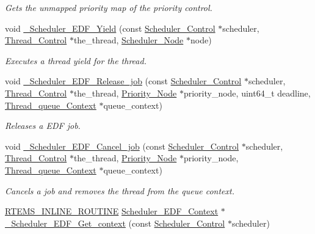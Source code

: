 \begin{DoxyCompactItemize}
\begin{DoxyCompactList}\small\item\em Gets the unmapped priority map of the priority control. \end{DoxyCompactList}\item 
void \mbox{\hyperlink{group__RTEMSScoreSchedulerEDF_ga1e56a56a016ef9317cae0090f846ceb6}{\+\_\+\+Scheduler\+\_\+\+E\+D\+F\+\_\+\+Yield}} (const \mbox{\hyperlink{struct__Scheduler__Control}{Scheduler\+\_\+\+Control}} $\ast$scheduler, \mbox{\hyperlink{struct__Thread__Control}{Thread\+\_\+\+Control}} $\ast$the\+\_\+thread, \mbox{\hyperlink{structScheduler__Node}{Scheduler\+\_\+\+Node}} $\ast$node)
\begin{DoxyCompactList}\small\item\em Executes a thread yield for the thread. \end{DoxyCompactList}\item 
void \mbox{\hyperlink{group__RTEMSScoreSchedulerEDF_gac0692f99a480bf873298367ffd5ec6a1}{\+\_\+\+Scheduler\+\_\+\+E\+D\+F\+\_\+\+Release\+\_\+job}} (const \mbox{\hyperlink{struct__Scheduler__Control}{Scheduler\+\_\+\+Control}} $\ast$scheduler, \mbox{\hyperlink{struct__Thread__Control}{Thread\+\_\+\+Control}} $\ast$the\+\_\+thread, \mbox{\hyperlink{structPriority__Node}{Priority\+\_\+\+Node}} $\ast$priority\+\_\+node, uint64\+\_\+t deadline, \mbox{\hyperlink{structThread__queue__Context}{Thread\+\_\+queue\+\_\+\+Context}} $\ast$queue\+\_\+context)
\begin{DoxyCompactList}\small\item\em Releases a E\+DF job. \end{DoxyCompactList}\item 
void \mbox{\hyperlink{group__RTEMSScoreSchedulerEDF_ga616d8e664dde0dc44953c47fa76aa65f}{\+\_\+\+Scheduler\+\_\+\+E\+D\+F\+\_\+\+Cancel\+\_\+job}} (const \mbox{\hyperlink{struct__Scheduler__Control}{Scheduler\+\_\+\+Control}} $\ast$scheduler, \mbox{\hyperlink{struct__Thread__Control}{Thread\+\_\+\+Control}} $\ast$the\+\_\+thread, \mbox{\hyperlink{structPriority__Node}{Priority\+\_\+\+Node}} $\ast$priority\+\_\+node, \mbox{\hyperlink{structThread__queue__Context}{Thread\+\_\+queue\+\_\+\+Context}} $\ast$queue\+\_\+context)
\begin{DoxyCompactList}\small\item\em Cancels a job and removes the thread from the queue context. \end{DoxyCompactList}\item 
\mbox{\hyperlink{group__RTEMSScoreBaseDefs_gac216239df231d5dbd15e3520b0b9313f}{R\+T\+E\+M\+S\+\_\+\+I\+N\+L\+I\+N\+E\+\_\+\+R\+O\+U\+T\+I\+NE}} \mbox{\hyperlink{structScheduler__EDF__Context}{Scheduler\+\_\+\+E\+D\+F\+\_\+\+Context}} $\ast$ \mbox{\hyperlink{group__RTEMSScoreSchedulerEDF_ga8f7bd3ea1cd129951cf3246eb4c31b1f}{\+\_\+\+Scheduler\+\_\+\+E\+D\+F\+\_\+\+Get\+\_\+context}} (const \mbox{\hyperlink{struct__Scheduler__Control}{Scheduler\+\_\+\+Control}} $\ast$scheduler)

\end{DoxyCompactItemize}
